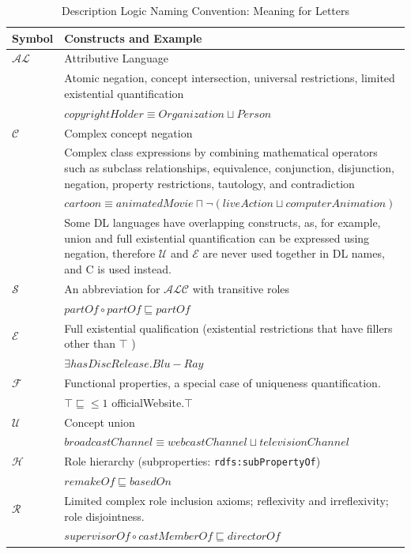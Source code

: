 \begin{longtable}[h]{ p{10mm} p{120mm} }
\caption{Description Logic Naming Convention: Meaning for Letters}
\label{table:DL_naming_convention}\\
\hline
Symbol & Constructs	and Example\\
\hline
$\mathcal{AL}$ & Attributive Language\\
& Atomic negation, concept intersection, universal restrictions, limited existential quantification\\
& $ copyrightHolder \equiv Organization \sqcup Person $\\
\hline
$\mathcal{C}$ & Complex concept negation\\
& Complex class expressions by combining mathematical operators such as subclass relationships, equivalence, conjunction, disjunction, negation, property restrictions, tautology, and contradiction\\
& $ cartoon \equiv animatedMovie \sqcap \neg (liveAction \sqcup computerAnimation) $\\
& Some DL languages have overlapping constructs, as, for example, union and full existential quantification can be expressed using negation, therefore $\mathcal{U}$ and $\mathcal{E}$ are never used together in DL names, and C is used instead.\\
\hline
$\mathcal{S}$ & An abbreviation for $\mathcal{ALC}$ with transitive roles\\
& $partOf \circ partOf \sqsubseteq partOf$\\
\hline
$\mathcal{E}$ &	Full existential qualification (existential restrictions that have fillers other than $\top$ )\\
& $ \exists hasDiscRelease.Blu-Ray $ \\
\hline
$\mathcal{F}$ &	Functional properties, a special case of uniqueness quantification.\\
& $ \top \sqsubseteq \leq 1$ officialWebsite$.\top $ \\
\hline
$\mathcal{U}$ &	Concept union\\
& $ broadcastChannel \equiv webcastChannel \sqcup televisionChannel $\\
\hline
$\mathcal{H}$ & Role hierarchy (subproperties: \texttt{rdfs:subPropertyOf})\\
& $ remakeOf \sqsubseteq basedOn $ \\
\hline
$\mathcal{R}$ & Limited complex role inclusion axioms; reflexivity and irreflexivity; role disjointness.\\
& $ supervisorOf \circ castMemberOf \sqsubseteq directorOf $ \\

\end{longtable}
